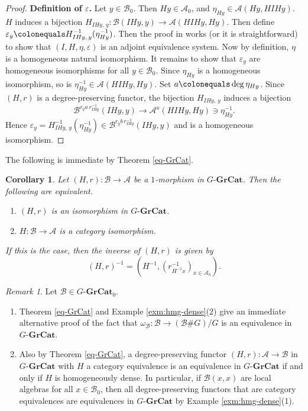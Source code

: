 \documentclass{surv-l}
\numberwithin{equation}{chapter}
\numberwithin{figure}{chapter}
\theoremstyle{plain}
\newtheorem{cor}[thm]{Corollary}
\theoremstyle{definition}
\theoremstyle{remark}
\newtheorem{rmk}[thm]{Remark}
\newcommand{\GGrCat}{G\text{-}\mathbf{GrCat}}
\begin{document}
\begin{proof}
{\bf Definition of $\varepsilon$.}
 Let $y \in \mathcal{B}_0$.
 Then $Hy \in \mathcal{A}_0$, and $\eta_{Hy} \in \mathcal{A}(Hy, HIHy)$.
 $H$ induces a bijection $H_{IHy,\, y} \colon \mathcal{B}(IHy, y) \to \mathcal{A}(HIHy, Hy)$.
 Then define $\varepsilon_y\colonequals  H_{IHy,\, y}^{-1}(\eta_{Hy}^{-1})$.
Then the proof in \cite[p.\ 93]{Mac} works (or it is straightforward) to show that
 $(I, H, \eta, \varepsilon)$ is an adjoint equivalence system.
Now by definition, $\eta$ is a homogeneous natural isomorphism.
It remains to show that $\varepsilon_y$ are homogeneous isomorphisms for all $y \in \mathcal{B}_0$.
Since $\eta_{Hy}$ is a homogeneous isomorphism, so is $\eta_{Hy}^{-1} \in \mathcal{A}(HIHy, Hy)$.
Set $a\colonequals \deg \eta_{Hy}$.
Since $(H, r)$ is a degree-preserving functor, the bijection
$H_{IHy,\, y}$ induces a bijection
\begin{equation*}
\mathcal{B}^{r_y a\, r_{IHy}^{-1}}(IHy, y) \to \mathcal{A}^{a}(HIHy, Hy) \ni \eta_{Hy}^{-1}.
\end{equation*}
Hence $\varepsilon_y = H_{IHy,\, y}^{-1}(\eta_{Hy}^{-1}) \in \mathcal{B}^{r_y b\, r_{IHy}^{-1}}(IHy, y)$
and is a homogeneous isomorphism.
\end{proof}

The following is  immediate by Theorem \ref{eq-GrCat}.

\begin{cor}\label{iso-GrCat}
Let $(H,r) \colon\mathcal{B}\to\mathcal{A}$ be a $1$-morphism in $\GGrCat$.
Then the following are equivalent.
\begin{enumerate}
\item $(H,r)$ is an isomorphism in $\GGrCat$.
\item $H \colon \mathcal{B} \to \mathcal{A}$ is a category isomorphism.
\end{enumerate}
If this is the case, then the inverse of $(H, r)$ is given by
\begin{equation*}
(H, r)^{-1} = (H^{-1}, (r_{H^{-1} x}^{-1})_{x \in \mathcal{A}_0}).
\end{equation*}
\end{cor}

\begin{rmk}\label{alternative-pf}
Let $\mathcal{B} \in \GGrCat_0$.
\begin{enumerate}
\item
Theorem \ref{eq-GrCat} and Example \ref{exm:hmg-dense}(2)
give an immediate alternative proof of the fact
that $\omega_{\mathcal{B}} \colon \mathcal{B} \to (\mathcal{B} \# G)/G$ is an equivalence in $\GGrCat$.
\item
Also by Theorem \ref{eq-GrCat}, a degree-preserving functor
$(H, r) \colon \mathcal{A} \to \mathcal{B}$ in $\GGrCat$  with $H$ a category equivalence
is an equivalence in $\GGrCat$
if and only if $H$ is homogeneously dense.
In particular,
if $\mathcal{B}(x, x)$ are local algebras for all $x \in \mathcal{B}_0$, then
all degree-preserving functors that are category equivalences are equivalences
in $\GGrCat$  by Example \ref{exm:hmg-dense}(1).
\end{enumerate}
\end{rmk}
\end{document}
